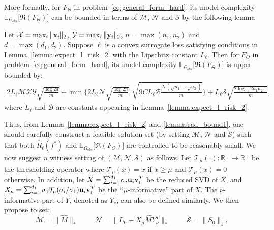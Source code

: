 \documentclass[twoside,11pt]{article}
\def\bu{{\bf u}}
\def\bv{{\bf v}}
\def\bx{{\bf x}}
\def\by{{\bf y}}
\def\R{\mathbb{R}}
\def\Obs{\Omega_{obs}}
\newcommand\Ex[2]{{\mathbb E}_{#1}\big[#2\big]}
\def\T{{\mathcal T}}  %
\def\bmax{{\mathcal B}}
\def\mmax{{\mathcal M}}
\def\nmax{{\mathcal N}}
\def\smax{{\mathcal S}}
\def\xmax{{\mathcal X}}
\def\ymax{{\mathcal Y}}
\def\wM{\hat{M}}
\def\rad{{\mathfrak R}}
\def\realL{L_0}
\def\realS{S_0}
\begin{document}
More formally, for $F_\Theta$ in problem~\eqref{eq:general_form_hard}, its model complexity $\Ex{\Obs}{\rad(F_\Theta)}$
can be bounded in terms of $\mmax$, $\nmax$ and $\smax$ by the following lemma:
\begin{lemma} %
\label{lemma:rad_bound1}
  Let $\xmax = \max_i\|\bx_i\|_2$, $\ymax = \max_i\|\by_i\|_2$,
  $n = \max(n_1, n_2)$ and $d = \max(d_1, d_2)$.
  Suppose $\ell$ is a convex surrogate loss satisfying conditions in
  Lemma~\ref{lemma:expect_l_risk_2} with the Lipschitz constant $L_\ell$.
  Then for $F_\Theta$ in problem~\eqref{eq:general_form_hard}, its
  model complexity $\Ex{\Obs}{\rad(F_\Theta)}$ is upper bounded by:
  \begin{align*}
    2L_\ell\mmax\xmax\ymax\sqrt{\frac{\log{2d}}{m}}
    +\min\bigg\{2L_\ell\nmax\sqrt{\frac{\log{2n}}{m}}, \sqrt{9CL_\ell\bmax\frac{\nmax(\sqrt{n_1}+\sqrt{n_2})}{m}}\bigg\}
    +L_\ell\smax\sqrt{\frac{2\log({2n_1n_2})}{m}},
  \end{align*}
  where $L_\ell$ and $\bmax$ are constants appearing in Lemma~\ref{lemma:expect_l_risk_2}.
\end{lemma}
Thus, from Lemma~\ref{lemma:expect_l_risk_2} and \ref{lemma:rad_bound1}, one should
carefully construct a feasible solution set (by setting $\mmax$, $\nmax$ and $\smax$)
such that both $\hat{R}_\ell(f^*)$ and
$\Ex{\Obs}{\rad(F_\Theta)}$ are controlled to be reasonably small.
We now suggest
a witness setting of $(\mmax, \nmax, \smax)$ as follows.
Let $\T_\mu(\cdot):\R^+ \rightarrow \R^+$ be the thresholding operator
where $\T_\mu(x) = x$ if $x \geq \mu$ and $\T_\mu(x) = 0$ otherwise.
In addition, let $X = \sum_{i=1}^{d_1} \sigma_i\bu_i\bv_i^T$ be the reduced SVD of $X$, and
$X_\mu = \sum_{i=1}^{d_1} \sigma_1\T_\mu(\sigma_i/\sigma_1)\bu_i\bv_i^T$ be
the ``$\mu$-informative'' part of $X$.  The $\nu$-informative part of $Y$, denoted as $Y_\nu$,
can also be defined similarly.  We then propose to set:
\begin{equation}
  \label{eq:feature_quality}
  \mmax = \|\wM\|_* \hspace{1cm}
  \nmax = \|\realL-X_\mu\wM Y_\nu^T\|_* \hspace{1cm}
    \smax = \|\realS\|_1,
\end{equation}
\end{document}
